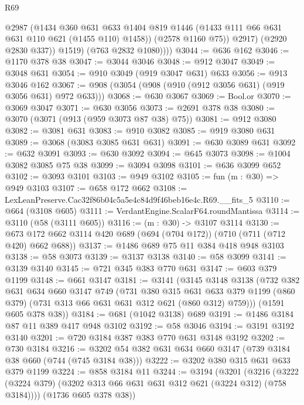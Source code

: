 \begin{lexlean}{R69}
\begin{coremodule}
                  @2987
                  (@1434
                    @360
                    @631
                    @633
                    @1404
                    @819
                    @1446
                    (@1433 @111 @66 @631 @631 @110 @621 (@1455 @110) @1458))
                  (@2578 @1160 @75))
                @2917)
              (@2920 @2830 @337))
            @1519)
          (@763 @2832 @1080))))
@3044 := @636 @162
@3046 := @1170 @378 @38
@3047 := @3044 @3046
@3048 := @912 @3047
@3049 := @3048 @631
@3054 := @910 @3049 (@919 @3047 @631) @633
@3056 := @913 @3046 @162
@3067 := @908 (@3054 (@908 (@910 (@912 @3056 @631) (@919 @3056 @631) @972 @633)))
@3068 := @630 @3067
@3069 := Bool.or
@3070 := @3069 @3047
@3071 := @630 @3056
@3073 := @2691 @378 @38
@3080 := @3070 (@3071 (@913 (@959 @3073 @87 @38) @75))
@3081 := @912 @3080
@3082 := @3081 @631
@3083 := @910 @3082
@3085 := @919 @3080 @631
@3089 := @3068 (@3083 @3085 @631 @631)
@3091 := @630 @3089 @631
@3092 := @632 @3091
@3093 := @630 @3092
@3094 := @645 @3073
@3098 := @1004 @3082 @3085 @75 @38
@3099 := @3094 @3098
@3101 := @636 @3099 @652
@3102 := @3093 @3101
@3103 := @949 @3102
@3105 := fun (m : @30) => @949 @3103
@3107 := @658 @172 @662
@3108 := LexLeanPreserve.Cac32f86b04c5a5e4c84d9f46beb16e4c.R69.__fits_5
@3110 := @664 (@3108 @605)
@3111 := VerdantEngine.ScalarF64.roundMantissa
@3114 := @3110 (@58 (@3111 @605))
@3116 := (m : @30) -> @3107 @3114
@3130 := @673 @172 @662 @3114 @420 @689 (@694 (@704 @172)) (@710 (@711 (@712 @420) @662 @688))
@3137 := @1486 @689 @75 @11 @384 @418 @948 @3103
@3138 := @58 @3073
@3139 := @3137 @3138
@3140 := @58 @3099
@3141 := @3139 @3140
@3145 := @721 @345 @383 @770 @631
@3147 := @603 @379 @1199
@3148 := @661 @3147
@3181 := @3141
    (@3145
      @3148
      @3138
      (@732
        @382
        @631
        @634
        @660
        @3147
        @749
        (@731
          @380
          @315
          @631
          @633
          @379
          @1199
          (@860 @379)
          (@731 @313 @66 @631 @631 @312 @621 (@860 @312) @759)))
      (@1591 @605 @378 @38))
@3184 := @681 (@1042 @3138) @689
@3191 := @1486 @3184 @87 @11 @389 @417 @948 @3102
@3192 := @58 @3046
@3194 := @3191 @3192 @3140
@3201 := @720 @3184 @387 @383 @770 @631 @3148 @3192
@3202 := @730 @3184
@3216 := @3202 @54 @382 @631 @634 @660 @3147 (@739 @3184 @38 @660 (@744 (@745 @3184 @38)))
@3222 := @3202 @380 @315 @631 @633 @379 @1199
@3224 := @858 @3184 @11
@3244 := @3194
    (@3201
      (@3216 (@3222 (@3224 @379) (@3202 @313 @66 @631 @631 @312 @621 (@3224 @312) (@758 @3184))))
      (@1736 @605 @378 @38))

\end{coremodule}
\end{lexlean}
